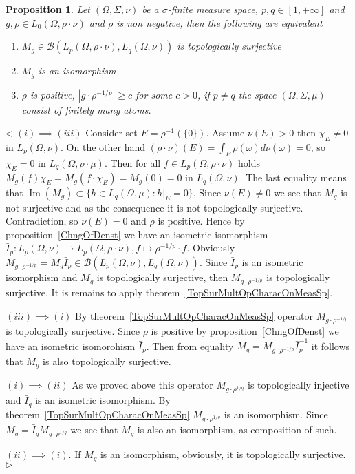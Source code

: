 \documentclass[12pt]{article}
\newtheorem{proposition}[theorem]{Proposition}
\newenvironment{proof}{\par $\triangleleft$}{$\triangleright$}
\begin{document}
\begin{proposition}\label{TopSurMultOpCharacBtwnTwoContMeasSp}
    Let $(\Omega,\Sigma,\nu)$ be a $\sigma$-finite measure space,
    $p,q\in[1,+\infty]$ and $g,\rho\in L_0(\Omega,\rho\cdot\nu)$ and $\rho$ is
    non negative, then the following are equivalent
    \begin{enumerate}[label = (\roman*)]
        \item $M_g\in\mathcal{B}(L_p(\Omega,\rho\cdot\nu),L_q(\Omega,\nu))$ is
              topologically surjective

        \item $M_g$ is an isomorphism

        \item $\rho$ is positive, $|g\cdot \rho^{-1/p}|\geq c$ for some
              $c>0$, if $p\neq q$ the space $(\Omega,\Sigma,\mu)$ consist of
              finitely many atoms.
    \end{enumerate}
\end{proposition}
\begin{proof} $(i)\implies (iii)$ Consider set $E=\rho^{-1}( \{0 \})$.
    Assume $\nu(E)>0$ then $\chi_E\neq 0$ in $L_p(\Omega,\nu)$. On the other
    hand $(\rho\cdot\nu)(E)=\int_E\rho(\omega)d\nu(\omega)=0$, so $\chi_E=0$
    in $L_q(\Omega,\rho\cdot\mu)$. Then for all $f\in L_p(\Omega,\rho\cdot\nu)$
    holds $M_g(f)\chi_E=M_g(f\cdot\chi_E)=M_g(0)=0$ in $L_q(\Omega,\nu)$.
    The last equality means that
    $\operatorname{Im}(M_g)\subset \{h\in L_q(\Omega,\mu): h|_E=0 \}$. Since
    $\nu(E)\neq 0$ we see that $M_g$ is not surjective and as the consequence
    it is not topologically surjective. Contradiction, so $\nu(E)=0$ and
    $\rho$ is positive. Hence by proposition~\ref{ChngOfDenst} we have an
    isometric isomorphism
    $\bar{I}_p:L_p(\Omega,\nu)\to
        L_p(\Omega,\rho\cdot\nu),f\mapsto \rho^{-1/p}\cdot f$. Obviously
    $M_{g\cdot\rho^{-1/p}}
        =M_g \bar{I}_p\in\mathcal{B}(L_p(\Omega,\nu),L_q(\Omega,\nu))$. Since
    $\bar{I}_p$ is an isometric isomorphism and $M_g$ is topologically
    surjective, then $M_{g\cdot \rho^{-1/p}}$ is topologically surjective.
    It is remains to apply theorem~\ref{TopSurMultOpCharacOnMeasSp}.

    $(iii)\implies (i)$ By theorem~\ref{TopSurMultOpCharacOnMeasSp} operator
    $M_{g\cdot\rho^{-1/p}}$ is topologically surjective. Since $\rho$ is
    positive by proposition~\ref{ChngOfDenst} we have an isometric
    isomorohism $\bar{I}_p$. Then from equality
    $M_g= M_{g\cdot\rho^{-1/p}}\bar{I}_p^{-1}$ it follows that $M_g$ is also
    topologically surjective.

    $(i)\implies (ii)$ As we proved above this operator
    $M_{g\cdot\rho^{1/q}}$ is topologically injective and $\bar{I}_q$ is an
    isometric isomorphism. By theorem~\ref{TopSurMultOpCharacOnMeasSp}
    $M_{g\cdot\rho^{1/q}}$ is an isomorphism. Since
    $M_g=\bar{I}_q M_{g\cdot\rho^{1/q}}$ we see that $M_g$ is also an
    isomorphism, as composition of such.

    $(ii)\implies (i)$. If $M_g$ is an isomorphism, obviously, it is
    topologically surjective.
\end{proof}
\end{document}
